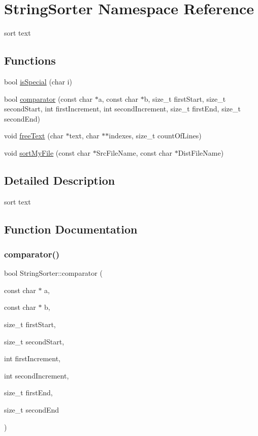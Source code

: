 \hypertarget{namespaceStringSorter}{}\section{String\+Sorter Namespace Reference}
\label{namespaceStringSorter}


sort text  


\subsection*{Functions}
\begin{DoxyCompactItemize}
\item 
bool \hyperlink{namespaceStringSorter_a289a1da05701ddcfc48d1f52079a59c6}{is\+Special} (char i)
\item 
bool \hyperlink{namespaceStringSorter_a88d9e7a6c97c437c529420a37e8670fa}{comparator} (const char $\ast$a, const char $\ast$b, size\+\_\+t first\+Start, size\+\_\+t second\+Start, int first\+Increment, int second\+Increment, size\+\_\+t first\+End, size\+\_\+t second\+End)
\item 
void \hyperlink{namespaceStringSorter_a0126ee4bad155337dd96dea4c5be66c5}{free\+Text} (char $\ast$text, char $\ast$$\ast$indexes, size\+\_\+t count\+Of\+Lines)
\item 
void \hyperlink{namespaceStringSorter_a16b92b697d5f8640ad8ba629d0b1afc3}{sort\+My\+File} (const char $\ast$Src\+File\+Name, const char $\ast$Dist\+File\+Name)
\end{DoxyCompactItemize}


\subsection{Detailed Description}
sort text 

\subsection{Function Documentation}
\mbox{\label{namespaceStringSorter_a88d9e7a6c97c437c529420a37e8670fa}} 
\subsubsection{\texorpdfstring{comparator()}{comparator()}}
{\footnotesize\ttfamily bool String\+Sorter\+::comparator (\begin{DoxyParamCaption}\item[{const char $\ast$}]{a,  }\item[{const char $\ast$}]{b,  }\item[{size\+\_\+t}]{first\+Start,  }\item[{size\+\_\+t}]{second\+Start,  }\item[{int}]{first\+Increment,  }\item[{int}]{second\+Increment,  }\item[{size\+\_\+t}]{first\+End,  }\item[{size\+\_\+t}]{second\+End }\end{DoxyParamCaption})}


